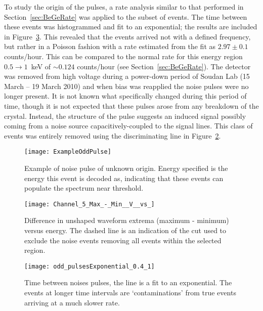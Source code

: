 	To study the origin of the pulses, a rate analysis similar to that performed in Section~\ref{sec:BeGeRate} was applied to the subset of events.  The time between these events was histogrammed and fit to an exponential; the results are included in Figure~\ref{fig:OddPulseRate}.  This revealed that the events arrived not with a defined frequency, but rather in a Poisson fashion with a rate estimated from the fit as $2.97 \pm 0.1$ counts/hour.  This can be compared to the normal rate for this energy region $0.5\to1$~keV of $\sim0.124$ counts/hour (see Section~\ref{sec:BeGeRate}).  The detector was removed from high voltage during a power-down period of Soudan Lab (15 March -- 19 March 2010) and when bias was reapplied the noise pulses were no longer present.  It is not known what specifically changed during this period of time, though it is not expected that these pulses arose from any breakdown of the crystal.  Instead, the structure of the pulse suggests an induced signal possibly coming from a noise source capacitively-coupled to the signal lines.  This class of events was entirely removed using the discriminating line in Figure~\ref{fig:OddPulseCut}.
	
			\begin{figure}
				\centering
				\texttt{[image: ExampleOddPulse]}
				\caption[Example of noise pulse of unknown origin]
				{Example of noise pulse of unknown origin.  Energy specified is the energy this event is decoded as, indicating that these events can populate
				 the spectrum near threshold.}
				\label{fig:OddPulseExample}
			\end{figure}	

			\begin{figure}
				\centering
				\texttt{[image: Channel\_5\_Max\_-\_Min\_\_V\_\_vs\_]}
				\caption[Difference in unshaped waveform extrema versus energy]
				{Difference in unshaped waveform extrema (maximum - minimum) versus energy.  The dashed line is an indication of the cut used to exclude the 
				noise events removing all events within the selected region. }
				\label{fig:OddPulseCut}
			\end{figure}

			\begin{figure}
				\centering
				\texttt{[image: odd\_pulsesExponential\_0.4\_1]}
				\caption[Time between noises pulses]
				{Time between noises pulses, the line is a fit to an exponential.  The events at longer time intervals are `contaminations' from true events arriving at a
				much slower rate.}
				\label{fig:OddPulseRate}
			\end{figure}
				

